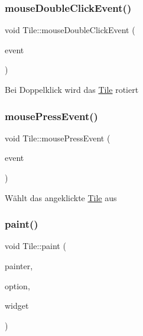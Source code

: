 \mbox{\label{class_tile_af1674a1e05675b4771e1b603ca385d42}} 
\subsubsection{\texorpdfstring{mouse\+Double\+Click\+Event()}{mouseDoubleClickEvent()}}
{\footnotesize\ttfamily void Tile\+::mouse\+Double\+Click\+Event (\begin{DoxyParamCaption}\item[{Q\+Graphics\+Scene\+Mouse\+Event $\ast$}]{event }\end{DoxyParamCaption})}

Bei Doppelklick wird das \mbox{\hyperlink{class_tile}{Tile}} rotiert \mbox{\label{class_tile_aecbd71c0de7fe3fd79bb1b8bbca4f265}} 
\subsubsection{\texorpdfstring{mouse\+Press\+Event()}{mousePressEvent()}}
{\footnotesize\ttfamily void Tile\+::mouse\+Press\+Event (\begin{DoxyParamCaption}\item[{Q\+Graphics\+Scene\+Mouse\+Event $\ast$}]{event }\end{DoxyParamCaption})}

Wählt das angeklickte \mbox{\hyperlink{class_tile}{Tile}} aus \mbox{\label{class_tile_ab0a7262b6fab842a7a467fcb2f7592eb}} 
\subsubsection{\texorpdfstring{paint()}{paint()}}
{\footnotesize\ttfamily void Tile\+::paint (\begin{DoxyParamCaption}\item[{Q\+Painter $\ast$}]{painter,  }\item[{const Q\+Style\+Option\+Graphics\+Item $\ast$}]{option,  }\item[{Q\+Widget $\ast$}]{widget }\end{DoxyParamCaption})\hspace{0.3cm}{\ttfamily [virtual]}}

